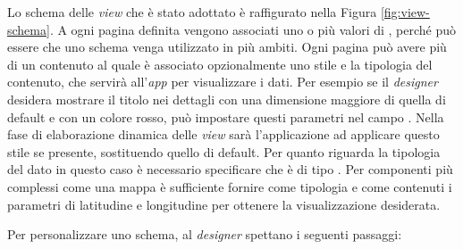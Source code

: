 Lo schema delle \emph{view} che è stato adottato è raffigurato nella Figura \ref{fig:view-schema}. A ogni pagina definita vengono associati uno o più valori di , perché può essere che uno schema venga utilizzato in più ambiti. Ogni pagina può avere più di un contenuto al quale è associato opzionalmente uno stile e la tipologia del contenuto, che servirà all'\emph{app} per visualizzare i dati. Per esempio se il \emph{designer} desidera mostrare il titolo nei dettagli con una dimensione maggiore di quella di default e con un colore rosso, può impostare questi parametri nel campo . Nella fase di elaborazione dinamica delle \emph{view} sarà l'applicazione ad applicare questo stile se presente, sostituendo quello di default. Per quanto riguarda la tipologia del dato  in questo caso è necessario specificare che è di tipo . Per componenti più complessi come una mappa è sufficiente fornire come tipologia  e come contenuti i parametri di latitudine e longitudine per ottenere la visualizzazione desiderata.

Per personalizzare uno schema, al \emph{designer} spettano i seguenti passaggi:


